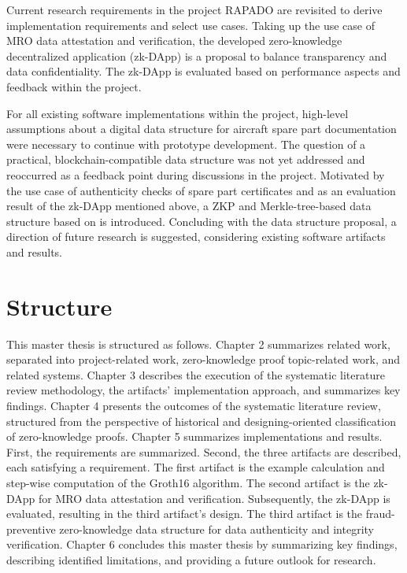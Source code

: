 Current research requirements in the project RAPADO are revisited to derive implementation requirements and select use cases. Taking up the use case of MRO data attestation and verification, the developed zero-knowledge decentralized application (zk-DApp) is a proposal to balance transparency and data confidentiality. The zk-DApp is evaluated based on performance aspects and feedback within the project.

For all existing software implementations within the project, high-level assumptions about a digital data structure for aircraft spare part documentation were necessary to continue with prototype development. The question of a practical, blockchain-compatible data structure was not yet addressed and reoccurred as a feedback point during discussions in the project. Motivated by the use case of authenticity checks of spare part certificates and as an evaluation result of the zk-DApp mentioned above, a ZKP and Merkle-tree-based data structure based on \citet{sedlemeirgrenenergy} is introduced. Concluding with the data structure proposal, a direction of future research is suggested, considering existing software artifacts and results.

\section{Structure}
This master thesis is structured as follows. Chapter 2 summarizes related work, separated into project-related work, zero-knowledge proof topic-related work, and related systems. Chapter 3 describes the execution of the systematic literature review methodology, the artifacts' implementation approach, and summarizes key findings. Chapter 4 presents the outcomes of the systematic literature review, structured from the perspective of historical and designing-oriented classification of zero-knowledge proofs. Chapter 5 summarizes implementations and results. First, the requirements are summarized. Second, the three artifacts are described, each satisfying a requirement. The first artifact is the example calculation and step-wise computation of the Groth16 algorithm. The second artifact is the zk-DApp for MRO data attestation and verification. Subsequently, the zk-DApp is evaluated, resulting in the third artifact's design. The third artifact is the fraud-preventive zero-knowledge data structure for data authenticity and integrity verification. Chapter 6 concludes this master thesis by summarizing key findings, describing identified limitations, and providing a future outlook for research.

